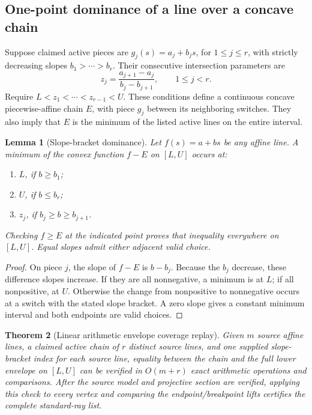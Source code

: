 \documentclass[11pt]{article}
\newtheorem{theorem}{Theorem}[section]
\newtheorem{lemma}[theorem]{Lemma}
\theoremstyle{definition}
\theoremstyle{remark}
\begin{document}
\subsection{One-point dominance of a line over a concave chain}

Suppose claimed active pieces are $g_j(s)=a_j+b_js$, for $1\le j\le r$,
with strictly decreasing slopes $b_1>\cdots>b_r$. Their consecutive
intersection parameters are
\begin{equation}
 z_j=\frac{a_{j+1}-a_j}{b_j-b_{j+1}},\qquad 1\le j<r.
 \label{eq:switches}
\end{equation}
Require $L<z_1<\cdots<z_{r-1}<U$. These conditions define a continuous
concave piecewise-affine chain $E$, with piece $g_j$ between its neighboring
switches. They also imply that $E$ is the minimum of the listed active lines
on the entire interval.

\begin{lemma}[Slope-bracket dominance]
\label{lem:bracket}
Let $f(s)=a+bs$ be any affine line. A minimum of the convex function $f-E$
on $[L,U]$ occurs at:
\begin{enumerate}
\item $L$, if $b\ge b_1$;
\item $U$, if $b\le b_r$;
\item $z_j$, if $b_j\ge b\ge b_{j+1}$.
\end{enumerate}
Checking $f\ge E$ at the indicated point proves that inequality everywhere
on $[L,U]$. Equal slopes admit either adjacent valid choice.
\end{lemma}

\begin{proof}
On piece $j$, the slope of $f-E$ is $b-b_j$. Because the $b_j$ decrease,
these difference slopes increase. If they are all nonnegative, a minimum is
at $L$; if all nonpositive, at $U$. Otherwise the change from nonpositive to
nonnegative occurs at a switch with the stated slope bracket. A zero slope
gives a constant minimum interval and both endpoints are valid choices.
\end{proof}

\begin{theorem}[Linear arithmetic envelope coverage replay]
\label{thm:coverage}
Given $m$ source affine lines, a claimed active chain of $r$ distinct source
lines, and one supplied slope-bracket index for each source line, equality
between the chain and the full lower envelope on $[L,U]$ can be verified in
$O(m+r)$ exact arithmetic operations and comparisons. After the source model
and projective section are verified, applying this check to every vertex and
comparing the endpoint/breakpoint lifts certifies the complete standard-ray
list.
\end{theorem}
\end{document}
